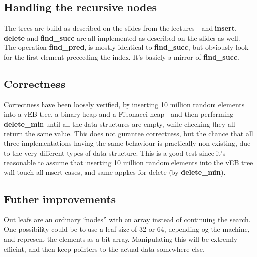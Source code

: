 \subsection*{Handling the recursive nodes}
The trees are build as described on the slides from the lectures - and \textbf{insert}, \textbf{delete} and \textbf{find\_succ} are all implemented as described on the slides as well. The operation \textbf{find\_pred}, is mostly identical to \textbf{find\_succ}, but obviously look for the first element preceeding the index. It's basicly a mirror of \textbf{find\_succ}.

\subsection*{Correctness}
Correctness have been loosely verified, by inserting 10 million random elements into a vEB tree, a binary heap and a Fibonacci heap - and then performing \textbf{delete\_min} until all the data structures are empty, while checking they all return the same value. This does not gurantee correctness, but the chance that all three implementations having the same behaviour is practically non-existing, due to the very different types of data structure. This is a good test since it's reasonable to assume that inserting 10 million random elements into the vEB tree will touch all insert cases, and same applies for delete (by \textbf{delete\_min}).

\subsection*{Futher improvements}
Out leafs are an ordinary ``nodes'' with an array instead of continuing the search. One possibility could be to use a leaf size of 32 or 64, depending og the machine, and represent the elements as a bit array. Manipulating this will be extremly efficint, and then keep pointers to the actual data somewhere else.